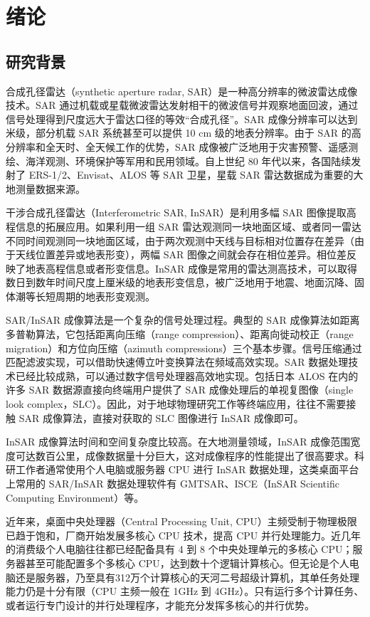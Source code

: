 \chapter{绪论}


\section{研究背景}

合成孔径雷达（synthetic aperture radar, SAR）是一种高分辨率的微波雷达成像技术。SAR 通过机载或星载微波雷达发射相干的微波信号并观察地面回波，通过信号处理得到尺度远大于雷达口径的等效“合成孔径”。SAR 成像分辨率可以达到米级，部分机载 SAR 系统甚至可以提供 10 cm 级的地表分辨率。由于 SAR 的高分辨率和全天时、全天候工作的优势，SAR 成像被广泛地用于灾害预警、遥感测绘、海洋观测、环境保护等军用和民用领域。自上世纪 80 年代以来，各国陆续发射了 ERS-1/2、Envisat、ALOS 等 SAR 卫星，星载 SAR 雷达数据成为重要的大地测量数据来源。

干涉合成孔径雷达（Interferometric SAR, InSAR）是利用多幅 SAR 图像提取高程信息的拓展应用。如果利用一组 SAR 雷达观测同一块地面区域、或者同一雷达不同时间观测同一块地面区域，由于两次观测中天线与目标相对位置存在差异（由于天线位置差异或地表形变），两幅 SAR 图像之间就会存在相位差异。相位差反映了地表高程信息或者形变信息。InSAR 成像是常用的雷达测高技术，可以取得数日到数年时间尺度上厘米级的地表形变信息，被广泛地用于地震、地面沉降、固体潮等长短周期的地表形变观测。

SAR/InSAR 成像算法是一个复杂的信号处理过程。典型的 SAR 成像算法如距离多普勒算法，它包括距离向压缩（range compression）、距离向徙动校正（range migration）和方位向压缩（azimuth compressions）三个基本步骤。信号压缩通过匹配滤波实现，可以借助快速傅立叶变换算法在频域高效实现。SAR 数据处理技术已经比较成熟，可以通过数字信号处理器高效地实现。包括日本 ALOS 在内的许多 SAR 数据源直接向终端用户提供了 SAR 成像处理后的单视复图像（single look complex，SLC）。因此，对于地球物理研究工作等终端应用，往往不需要接触 SAR 成像算法，直接对获取的 SLC 图像进行 InSAR 成像即可。

InSAR 成像算法时间和空间复杂度比较高。在大地测量领域，InSAR 成像范围宽度可达数百公里，成像数据量十分巨大，这对成像程序的性能提出了很高要求。科研工作者通常使用个人电脑或服务器 CPU 进行 InSAR 数据处理，这类桌面平台上常用的 SAR/InSAR 数据处理软件有 GMTSAR\cite{web:gmtsar}、ISCE（InSAR Scientific Computing Environment）\cite{web:isce}等。

近年来，桌面中央处理器（Central Processing Unit, CPU）主频受制于物理极限已趋于饱和，厂商开始发展多核心 CPU 技术，提高 CPU 并行处理能力。近几年的消费级个人电脑往往都已经配备具有 4 到 8 个中央处理单元的多核心 CPU；服务器甚至可能配置多个多核心 CPU，达到数十个逻辑计算核心。但无论是个人电脑还是服务器，乃至具有312万个计算核心的天河二号超级计算机，其单任务处理能力仍是十分有限（CPU 主频一般在 1GHz 到 4GHz）。只有运行多个计算任务、或者运行专门设计的并行处理程序，才能充分发挥多核心的并行优势。

